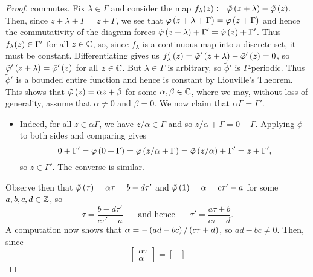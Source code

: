\documentclass[../Moduli_Spaces_of_Riemann_Surfaces.tex]{subfiles}
\begin{document}
\begin{proof}
        commutes. Fix $\lambda\in\Gamma$ and consider the map $f_\lambda\!\left(z\right)\coloneqq\tilde{\varphi}\left(z+\lambda\right)-\tilde{\varphi}\left(z\right)$. Then, since $z+\lambda+\Gamma=z+\Gamma$, we see that $\varphi\left(z+\lambda+\Gamma\right)=\varphi\left(z+\Gamma\right)$ and hence the commutativity of the diagram forces $\tilde{\varphi}\left(z+\lambda\right)+\Gamma'=\tilde{\varphi}\left(z\right)+\Gamma'$. Thus $f_\lambda\!\left(z\right)\in\Gamma'$ for all $z\in\mathbb{C}$, so, since $f_\lambda$ is a continuous map into a discrete set, it must be constant. Differentiating gives us $f_\lambda'\left(z\right)=\tilde{\varphi}'\left(z+\lambda\right)-\tilde{\varphi}'\left(z\right)=0$, so $\tilde{\varphi}'\left(z+\lambda\right)=\tilde{\varphi}'\left(z\right)$ for all $z\in\mathbb{C}$. But $\lambda\in\Gamma$ is arbitrary, so $\tilde{\phi}'$ is $\Gamma$-periodic. Thus $\tilde{\phi}'$ is a bounded entire function and hence is constant by Liouville's Theorem. This shows that $\tilde{\varphi}\left(z\right)=\alpha z+\beta$ for some $\alpha,\beta\in\mathbb{C}$, where we may, without loss of generality, assume that $\alpha\neq0$ and $\beta=0$. We now claim that $\alpha\Gamma=\Gamma'$.
        \begin{itemize}
            \item Indeed, for all $z\in\alpha\Gamma$, we have $z/\alpha\in\Gamma$ and so $z/\alpha+\Gamma=0+\Gamma$. Applying $\phi$ to both sides and comparing gives
                \begin{equation*}
                    0+\Gamma'=\varphi\left(0+\Gamma\right)=\varphi\left(z/\alpha+\Gamma\right)=\tilde{\varphi}\left(z/\alpha\right)+\Gamma'=z+\Gamma',
                \end{equation*}
                so $z\in\Gamma'$. The converse is similar.
        \end{itemize}
        Observe then that $\tilde{\varphi}\left(\tau\right)=\alpha\tau=b-d\tau'$ and $\tilde{\varphi}\left(1\right)=\alpha=c\tau'-a$ for some $a,b,c,d\in\mathbb{Z}$, so
        \begin{equation*}
            \tau=\frac{b-d\tau'}{c\tau'-a}\ \ \ \ \ \ \ \ \textrm{and hence}\ \ \ \ \ \ \ \ \tau'=\frac{a\tau+b}{c\tau+d}.
        \end{equation*}
        A computation now shows that $\alpha=-\left(ad-bc\right)/\left(c\tau+d\right)$, so $ad-bc\neq0$. Then, since
        \begin{equation*}
            \begin{bmatrix}
                \alpha\tau \\ \alpha
            \end{bmatrix}=
            \begin{bmatrix}

\end{bmatrix}
\end{equation*}
\end{proof}
\end{document}
